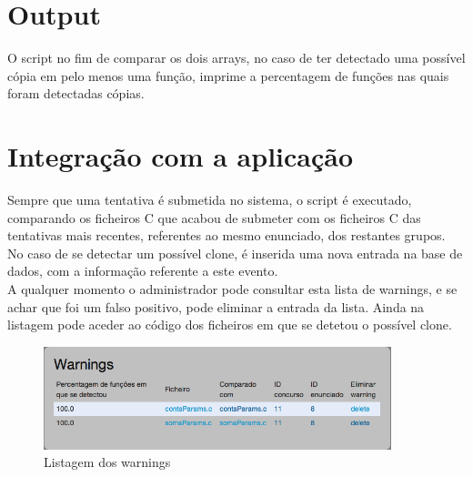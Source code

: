 \section{Output	}
O script no fim de comparar os dois arrays, no caso de ter detectado uma possível cópia em pelo menos uma função, imprime a percentagem de funções nas quais foram detectadas cópias.

\section{Integração com a aplicação}
Sempre que uma tentativa é submetida no sistema, o script é executado, comparando os ficheiros C que acabou de submeter com os ficheiros C das tentativas mais recentes, referentes ao mesmo enunciado, dos restantes grupos.\\
No caso de se detectar um possível clone, é inserida uma nova entrada na base de dados, com a informação referente a este evento.\\
A qualquer momento o administrador pode consultar esta lista de warnings, e se achar que foi um falso positivo, pode eliminar a entrada da lista. Ainda na listagem pode aceder ao código dos ficheiros em que se detetou o possível clone.


\begin{figure}[htbp]
\begin{center}
\includegraphics[width=0.9\textwidth]{Images/clone_warning_index}
\caption{Listagem dos warnings}\label{fig clone_index}
\end{center}
\end{figure}
